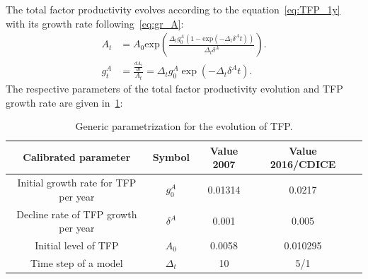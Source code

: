 \documentclass[11pt, a4paper, pdftex, twoside, dvipsnames]{article}
\begin{document}
\begin{appendices}
The total factor productivity evolves according to the equation~\cref{eq:TFP_1y} with its growth rate following~\cref{eq:gr_A}: 
\begin{align}
    \label{eq:TFP_1y}
    A_t &= A_0 \text{exp} \left( \frac{\Delta_t g^A_0 (1 - \text{exp}(-\Delta_t\delta^A t) )}{\Delta_t\delta^A}   \right) .\\
    \label{eq:gr_A}
    g^{A}_{t} & = \frac{\frac{dA_{t}}{dt}}{A_t} =
    \Delta_tg^A_0\exp\left(-\Delta_t\delta^A t\right).
\end{align}
 The respective parameters of the total factor productivity evolution and TFP growth rate are given in~\cref{table:TFP}:
%
\begin{table}[H]
\centering
\begin{tabular}{ c c c c c  } 
 \toprule
 Calibrated parameter & Symbol  & Value 2007 & Value 2016/CDICE \\ 
 \midrule
 Initial growth rate for TFP per year & $g^A_0$  & 0.01314 & 0.0217  \\ 
 Decline rate of TFP growth per year & $\delta^A$  & 0.001 & 0.005 \\ 
 Initial level of TFP & $A_0$  & 0.0058 & 0.010295 \\ 
 Time step of a model & $\Delta_t$  & 10 & 5/1 \\ 
 \bottomrule
\end{tabular}
\caption{Generic parametrization for the evolution of TFP.}
\label{table:TFP}
\end{table}




\end{appendices}
\end{document}
